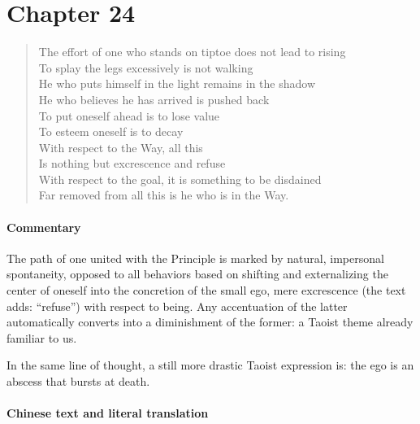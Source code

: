 \section{Chapter 24}

\begin{quotex}
\begin{verse}
The effort of one who stands on tiptoe does not lead to rising\\
To splay the legs excessively is not walking\\
He who puts himself in the light remains in the shadow\\
He who believes he has arrived is pushed back\\
To put oneself ahead is to lose value\\
To esteem oneself is to decay\\
With respect to the Way, all this\\
Is nothing but excrescence and refuse\\
With respect to the goal, it is something to be disdained\\
Far removed from all this is he who is in the Way.
\end{verse}
\end{quotex}

\paragraph{Commentary}


The path of one united with the Principle is marked by natural, impersonal spontaneity, opposed to all behaviors based on shifting and externalizing the center of oneself into the concretion of the small ego, mere excrescence (the text adds: ``refuse'') with respect to being. Any accentuation of the latter automatically converts into a diminishment of the former: a Taoist theme already familiar to us.

In the same line of thought, a still more drastic Taoist expression is: the ego is an abscess that bursts at death.

\paragraph{Chinese text and literal translation}


